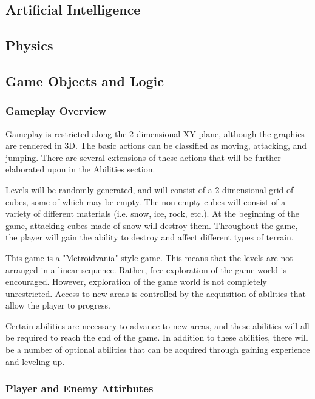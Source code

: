 \documentclass{article}
\begin{document}
\subsection{Artificial Intelligence}

\subsection{Physics}

\subsection{Game Objects and Logic}

\subsubsection{Gameplay Overview}

Gameplay is restricted along the 2-dimensional XY plane, although the graphics are rendered in 3D.  The basic actions can be classified as moving, attacking, and jumping.  There are several extensions of these actions that will be further elaborated upon in the Abilities section.

Levels will be randomly generated, and will consist of a 2-dimensional grid of cubes, some of which may be empty.  The non-empty cubes will consist of a variety of different materials (i.e. snow, ice, rock, etc.).  At the beginning of the game, attacking cubes made of snow will destroy them.  Throughout the game, the player will gain the ability to destroy and affect different types of terrain.

This game is a "Metroidvania" style game.  This means that the levels are not arranged in a linear sequence.  Rather, free exploration of the game world is encouraged.  However, exploration of the game world is not completely unrestricted.  Access to new areas is controlled by the acquisition of abilities that allow the player to progress.

Certain abilities are necessary to advance to new areas, and these abilities will all be required to reach the end of the game.  In addition to these abilities, there will  be a number of optional abilities that can be acquired through gaining experience and leveling-up.

\subsubsection{Player and Enemy Attirbutes}
\end{document}
